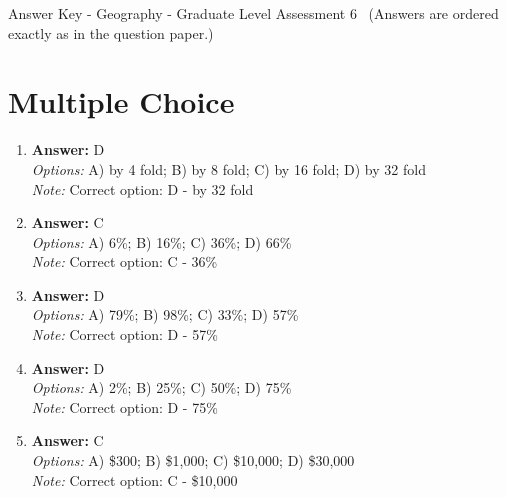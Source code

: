 \documentclass[12pt]{article}
\begin{document}
\begin{center}
Answer Key - Geography - Graduate Level Assessment 6 \
\small (Answers are ordered exactly as in the question paper.)
\end{center}

\section*{Multiple Choice}
\begin{enumerate}[label=\arabic*.]
\item \textbf{Answer:} D
\\ \textit{Options:} A) by 4 fold; B) by 8 fold; C) by 16 fold; D) by 32 fold
\\ \textit{Note:} Correct option: D - by 32 fold
\item \textbf{Answer:} C
\\ \textit{Options:} A) 6\%; B) 16\%; C) 36\%; D) 66\%
\\ \textit{Note:} Correct option: C - 36\%
\item \textbf{Answer:} D
\\ \textit{Options:} A) 79\%; B) 98\%; C) 33\%; D) 57\%
\\ \textit{Note:} Correct option: D - 57\%
\item \textbf{Answer:} D
\\ \textit{Options:} A) 2\%; B) 25\%; C) 50\%; D) 75\%
\\ \textit{Note:} Correct option: D - 75\%
\item \textbf{Answer:} C
\\ \textit{Options:} A) \$300; B) \$1,000; C) \$10,000; D) \$30,000
\\ \textit{Note:} Correct option: C - \$10,000
\end{enumerate}
\end{document}
